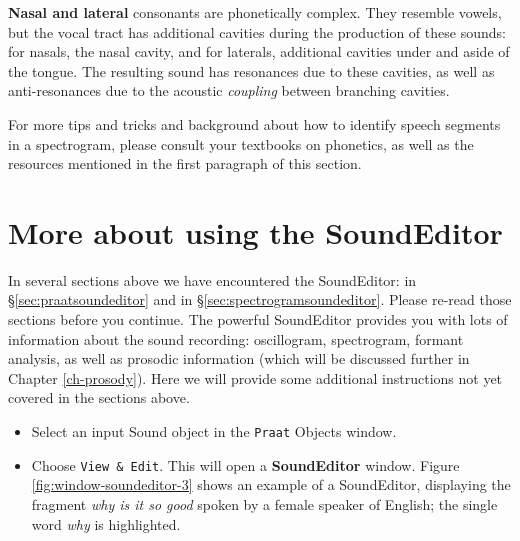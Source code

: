 \documentclass[
]{book}
\begin{document}
\textbf{Nasal and lateral} consonants are phonetically complex. They resemble vowels, but the vocal tract has additional cavities during the production of these sounds: for nasals, the nasal cavity, and for laterals, additional cavities under and aside of the tongue. The resulting sound has resonances due to these cavities, as well as anti-resonances due to the acoustic \emph{coupling} between branching cavities.

For more tips and tricks and background about how to identify speech segments in a spectrogram, please consult your textbooks on phonetics, as well as the resources mentioned in the first paragraph of this section.

\section{More about using the SoundEditor}\label{sec:soundeditor3}

In several sections above we have encountered the SoundEditor: in §\ref{sec:praatsoundeditor} and in §\ref{sec:spectrogramsoundeditor}. Please re-read those sections before you continue.
The powerful SoundEditor provides you with lots of information about the sound recording: oscillogram, spectrogram, formant analysis, as well as prosodic information (which will be discussed further in Chapter \ref{ch-prosody}).
Here we will provide some additional instructions not yet covered in the sections above.

\label{box-soundeditor-3}
\begin{itemize}
\item
  Select an input Sound object in the \texttt{Praat} Objects window.
\item
  Choose \texttt{View\ \&\ Edit}.
  This will open a \textbf{SoundEditor} window.
  Figure \ref{fig:window-soundeditor-3} shows an example of a SoundEditor, displaying the fragment \emph{why is it so good} spoken by a female speaker of English; the single word \emph{why} is highlighted.
\end{itemize}
\end{document}
